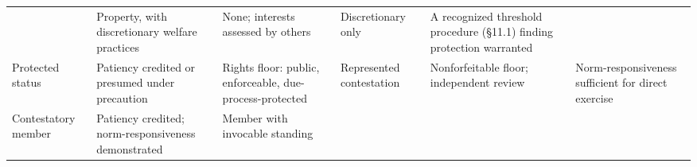 \documentclass[
  11pt,
  letterpaper,
]{article}
\begin{document}
\begin{longtable}[]{@{}llllll@{}}
\begin{minipage}[t]{0.14\columnwidth}
\end{minipage} & \begin{minipage}[t]{0.14\columnwidth}\raggedright
Property, with discretionary welfare practices\strut
\end{minipage} & \begin{minipage}[t]{0.14\columnwidth}\raggedright
None; interests assessed by others\strut
\end{minipage} & \begin{minipage}[t]{0.14\columnwidth}\raggedright
Discretionary only\strut
\end{minipage} & \begin{minipage}[t]{0.14\columnwidth}\raggedright
A recognized threshold procedure (§11.1) finding protection
warranted\strut
\end{minipage}\tabularnewline
\begin{minipage}[t]{0.14\columnwidth}\raggedright
Protected status\strut
\end{minipage} & \begin{minipage}[t]{0.14\columnwidth}\raggedright
Patiency credited or presumed under precaution\strut
\end{minipage} & \begin{minipage}[t]{0.14\columnwidth}\raggedright
Rights floor: public, enforceable, due-process-protected\strut
\end{minipage} & \begin{minipage}[t]{0.14\columnwidth}\raggedright
Represented contestation\strut
\end{minipage} & \begin{minipage}[t]{0.14\columnwidth}\raggedright
Nonforfeitable floor; independent review\strut
\end{minipage} & \begin{minipage}[t]{0.14\columnwidth}\raggedright
Norm-responsiveness sufficient for direct exercise\strut
\end{minipage}\tabularnewline
\begin{minipage}[t]{0.14\columnwidth}\raggedright
Contestatory member\strut
\end{minipage} & \begin{minipage}[t]{0.14\columnwidth}\raggedright
Patiency credited; norm-responsiveness demonstrated\strut
\end{minipage} & \begin{minipage}[t]{0.14\columnwidth}\raggedright
Member with invocable standing\strut
\end{minipage} & \begin{minipage}[t]{0.14\columnwidth}\raggedright

\end{minipage}
\end{longtable}
\end{document}
